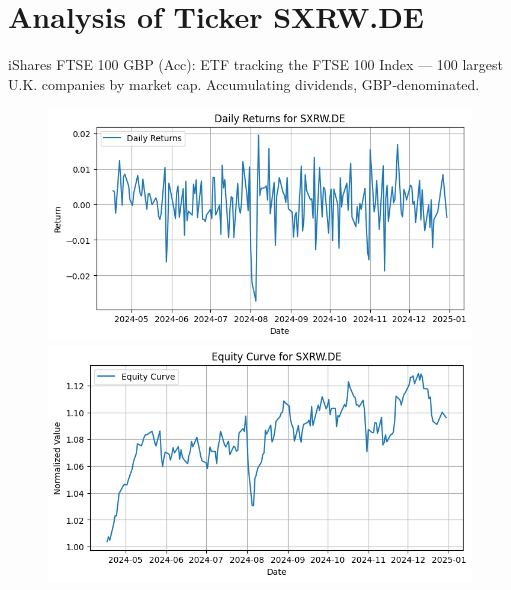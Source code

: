 \documentclass{article}%
\begin{document}
%
\newpage

%
\section*{Analysis of Ticker SXRW.DE}%
\label{sec:AnalysisofTickerSXRW.DE}%
iShares FTSE 100 GBP (Acc): ETF tracking the FTSE 100 Index — 100 largest U.K. companies by market cap. Accumulating dividends, GBP‑denominated.%


\begin{figure}[htbp]%
\begin{minipage}{0.49\textwidth}%
\includegraphics[width=\linewidth]{ticker_images/SXRW.DE_daily_returns.png}%
\end{minipage}%
\begin{minipage}{0.49\textwidth}%
\includegraphics[width=\linewidth]{ticker_images/SXRW.DE_equity_curve.png}%
\end{minipage}%
\end{figure}

%
\end{document}
